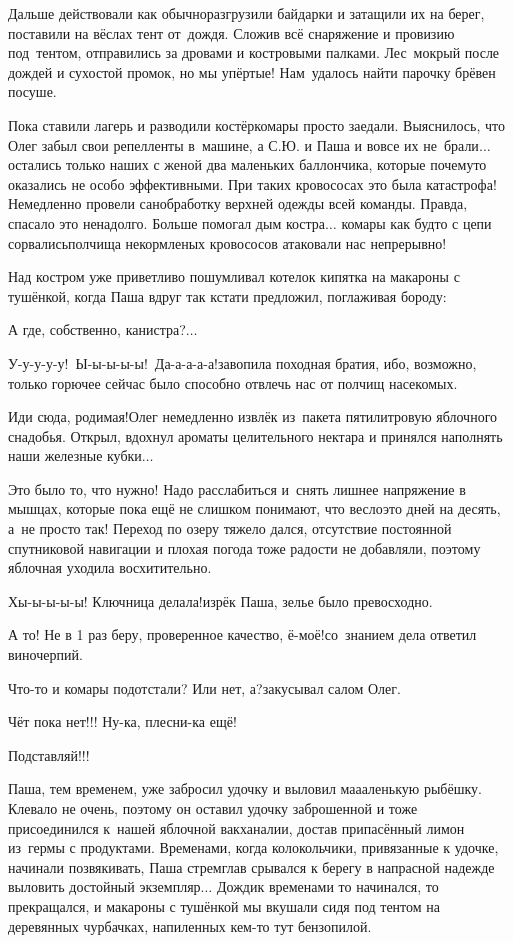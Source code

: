 Дальше действовали как обычно\mdash разгрузили байдарки и затащили их на берег, поставили на вёслах тент от~дождя. Сложив всё снаряжение и провизию под~тентом, отправились за дровами и костровыми палками. Лес~мокрый после дождей и сухостой промок, но мы упёртые! Нам~удалось найти парочку брёвен посуше. 

Пока ставили лагерь и разводили костёр\mdash комары просто заедали. Выяснилось, что Олег забыл свои репелленты в~машине, а С.Ю. и Паша и вовсе их не~брали$\ldots$ остались только наших с женой два маленьких баллончика, которые почему\sdash то оказались не особо эффективными. При таких кровососах это была катастрофа! Немедленно провели санобработку верхней одежды всей команды. Правда, спасало это ненадолго. Больше помогал дым костра$\ldots$ комары как будто с цепи сорвались\mdash полчища некормленых кровососов атаковали нас непрерывно!

Над костром уже приветливо пошумливал котелок кипятка на макароны с тушёнкой, когда Паша вдруг так кстати предложил, поглаживая бороду: 

\diagdash А где, собственно, канистра?$\ldots$

\diagdash У-у-у-у-у!~Ы-ы-ы-ы-ы!~Да-а-а-а-а!\mdash завопила походная братия, ибо, возможно, только горючее сейчас было способно отвлечь нас от полчищ насекомых.
 
\diagdash Иди сюда, родимая!\mdash Олег немедленно извлёк из~пакета пятилитровую яблочного снадобья. Открыл, вдохнул ароматы целительного нектара и принялся наполнять наши железные кубки$\ldots$

Это было то, что нужно! Надо расслабиться и~снять лишнее напряжение в мышцах, которые пока ещё не слишком понимают, что весло\mdash это дней на десять, а~не просто так! Переход по озеру тяжело дался, отсутствие постоянной спутниковой навигации и плохая погода тоже радости не добавляли, поэтому яблочная уходила восхитительно.

\diagdash Хы-ы-ы-ы-ы! Ключница делала!\mdash изрёк Паша, зелье было превосходно.

\diagdash А то! Не в 1 раз беру, проверенное качество, ё-моё!\mdash со~знанием дела ответил виночерпий.

\diagdash Что-то и комары подотстали? Или нет, а?\mdash закусывал салом Олег.

\diagdash Чёт пока нет!!! Ну-ка, плесни-ка ещё!

\diagdash Подставляй!!!

Паша, тем временем, уже забросил удочку и выловил ма\sdash а\sdash аленькую рыбёшку. Клевало не очень, поэтому он оставил удочку заброшенной и тоже присоединился к~нашей яблочной вакханалии, достав припасённый лимон из~гермы с продуктами. Временами, когда колокольчики, привязанные к удочке, начинали позвякивать, Паша стремглав срывался к берегу в напрасной надежде выловить достойный экземпляр$\ldots$ Дождик временами то начинался, то прекращался, и макароны с тушёнкой мы вкушали сидя под тентом на деревянных чурбачках, напиленных кем-то тут бензопилой. 

